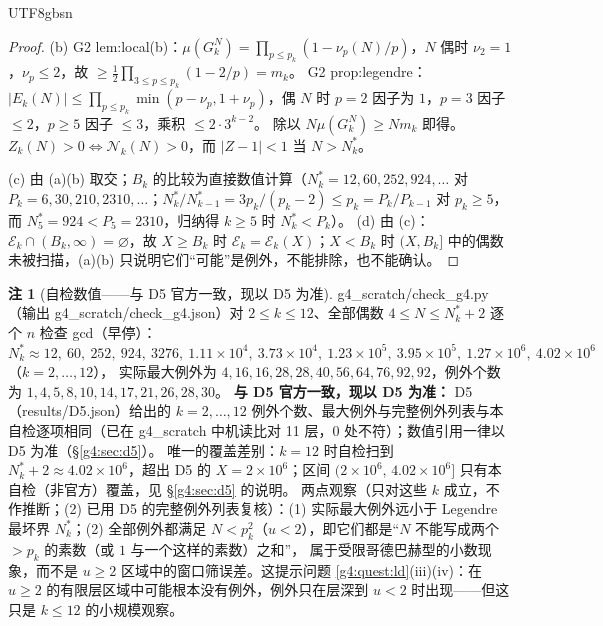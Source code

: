 \documentclass[11pt,a4paper]{article}
\newcommand{\Haar}{\mu}
\newcommand{\Cnt}{\mathcal N}          %
\newcommand{\Exc}{\mathcal E}          %
\theoremstyle{plain}
\theoremstyle{definition}
\newtheorem{rem}[lem]{注}
\begin{document}
\begin{CJK}{UTF8}{gbsn}
\begin{proof}
(b) G2 lem:local(b)：$\Haar(G_k^N)=\prod_{p\le p_k}(1-\nu_p(N)/p)$，$N$ 偶时 $\nu_2=1$，$\nu_p\le2$，故 $\ge\frac12\prod_{3\le p\le p_k}(1-2/p)=m_k$。
G2 prop:legendre：$|E_k(N)|\le\prod_{p\le p_k}\min(p-\nu_p,1+\nu_p)$，偶 $N$ 时 $p=2$ 因子为 $1$，$p=3$ 因子 $\le2$，$p\ge5$ 因子 $\le3$，乘积 $\le2\cdot3^{k-2}$。
除以 $N\Haar(G_k^N)\ge Nm_k$ 即得。$Z_k(N)>0\iff\Cnt_k(N)>0$，而 $|Z-1|<1$ 当 $N>N_k^*$。

(c) 由 (a)(b) 取交；$B_k$ 的比较为直接数值计算（$N_k^*=12,60,252,924,\dots$ 对 $P_k=6,30,210,2310,\dots$；$N_k^*/N_{k-1}^*=3p_k/(p_k-2)\le p_k=P_k/P_{k-1}$ 对 $p_k\ge5$，而 $N_5^*=924<P_5=2310$，归纳得 $k\ge5$ 时 $N_k^*<P_k$）。
(d) 由 (c)：$\Exc_k\cap(B_k,\infty)=\varnothing$，故 $X\ge B_k$ 时 $\Exc_k=\Exc_k(X)$；$X<B_k$ 时 $(X,B_k]$ 中的偶数未被扫描，(a)(b) 只说明它们“可能”是例外，不能排除，也不能确认。
\end{proof}

\begin{rem}[自检数值——与 D5 官方一致，现以 D5 为准]\label{g4:rem:scratch}
g4\_scratch/check\_g4.py（输出 g4\_scratch/check\_g4.json）对 $2\le k\le12$、全部偶数 $4\le N\le N_k^*+2$ 逐个 $n$ 检查 gcd（早停）：
$N_k^*\approx12,\ 60,\ 252,\ 924,\ 3276,\ 1.11\times10^4,\ 3.73\times10^4,\ 1.23\times10^5,\ 3.95\times10^5,\ 1.27\times10^6,\ 4.02\times10^6$（$k=2,\dots,12$），
实际最大例外为 $4,16,16,28,28,40,56,64,76,92,92$，例外个数为 $1,4,5,8,10,14,17,21,26,28,30$。
\textbf{与 D5 官方一致，现以 D5 为准：} D5 \cite{D5}（results/D5.json）给出的 $k=2,\dots,12$ 例外个数、最大例外与完整例外列表与本自检逐项相同（已在 g4\_scratch 中机读比对 11 层，$0$ 处不符）；数值引用一律以 D5 为准（\S\ref{g4:sec:d5}）。
唯一的覆盖差别：$k=12$ 时自检扫到 $N_k^*+2\approx4.02\times10^6$，超出 D5 的 $X=2\times10^6$；区间 $(2\times10^6,\,4.02\times10^6]$ 只有本自检（非官方）覆盖，见 \S\ref{g4:sec:d5} 的说明。
两点观察（只对这些 $k$ 成立，不作推断；(2) 已用 D5 的完整例外列表复核）：(1) 实际最大例外远小于 Legendre 最坏界 $N_k^*$；(2) 全部例外都满足 $N<p_k^2$（$u<2$），即它们都是“$N$ 不能写成两个 $>p_k$ 的素数（或 $1$ 与一个这样的素数）之和”，
属于受限哥德巴赫型的小数现象，而不是 $u\ge2$ 区域中的窗口筛误差。这提示问题 \ref{g4:quest:ld}(iii)(iv)：在 $u\ge2$ 的有限层区域中可能根本没有例外，例外只在层深到 $u<2$ 时出现——但这只是 $k\le12$ 的小规模观察。
\end{rem}


\end{CJK}
\end{document}
